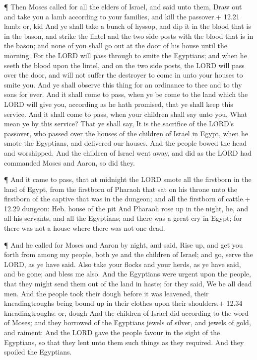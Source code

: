  ¶ Then Moses called for all the elders of Israel, and said
unto them, Draw out and take you a lamb according to your families, and
kill the passover.+ 12.21 lamb: or, kid  And ye shall take
a bunch of hyssop, and dip it in the blood that is in the bason, and
strike the lintel and the two side posts with the blood that is in the
bason; and none of you shall go out at the door of his house until the
morning.  For the LORD will pass through to smite the
Egyptians; and when he seeth the blood upon the lintel, and on the two
side posts, the LORD will pass over the door, and will not suffer the
destroyer to come in unto your houses to smite you.  And ye
shall observe this thing for an ordinance to thee and to thy sons for
ever.  And it shall come to pass, when ye be come to the
land which the LORD will give you, according as he hath promised, that
ye shall keep this service.  And it shall come to pass,
when your children shall say unto you, What mean ye by this service?
 That ye shall say, It is the sacrifice of the LORD's
passover, who passed over the houses of the children of Israel in Egypt,
when he smote the Egyptians, and delivered our houses. And the people
bowed the head and worshipped.  And the children of Israel
went away, and did as the LORD had commanded Moses and Aaron, so did
they.

 ¶ And it came to pass, that at midnight the LORD smote all
the firstborn in the land of Egypt, from the firstborn of Pharaoh that
sat on his throne unto the firstborn of the captive that was in the
dungeon; and all the firstborn of cattle.+ 12.29 dungeon: Heb. house of
the pit  And Pharaoh rose up in the night, he, and all his
servants, and all the Egyptians; and there was a great cry in Egypt; for
there was not a house where there was not one dead.

 ¶ And he called for Moses and Aaron by night, and said,
Rise up, and get you forth from among my people, both ye and the
children of Israel; and go, serve the LORD, as ye have said.
 Also take your flocks and your herds, as ye have said, and
be gone; and bless me also.  And the Egyptians were urgent
upon the people, that they might send them out of the land in haste; for
they said, We be all dead men.  And the people took their
dough before it was leavened, their kneadingtroughs being bound up in
their clothes upon their shoulders.+ 12.34 kneadingtroughs: or, dough
 And the children of Israel did according to the word of
Moses; and they borrowed of the Egyptians jewels of silver, and jewels
of gold, and raiment:  And the LORD gave the people favour
in the sight of the Egyptians, so that they lent unto them such things
as they required. And they spoiled the Egyptians.


